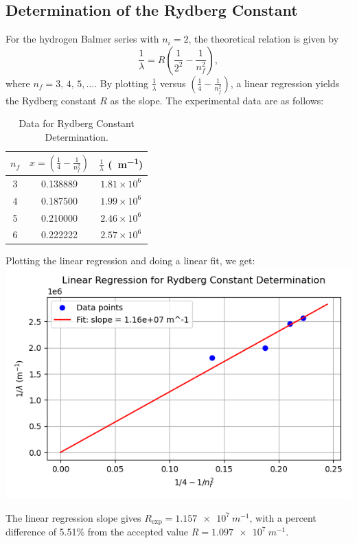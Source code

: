\documentclass[12pt]{article}
\begin{document}
\subsection{Determination of the Rydberg Constant}
For the hydrogen Balmer series with \(n_i = 2\), the theoretical relation is given by
\[
\frac{1}{\lambda} = R \left(\frac{1}{2^2} - \frac{1}{n_f^2}\right),
\]
where \(n_f = 3,\,4,\,5,\dots\). By plotting \(\frac{1}{\lambda}\) versus \(\left(\frac{1}{4}-\frac{1}{n_f^2}\right)\), a linear regression yields the Rydberg constant \(R\) as the slope. The experimental data are as follows:

\begin{table}[H]
  \centering
  \caption{Data for Rydberg Constant Determination.}
  \begin{tabular}{ccc}
    \toprule
    \(n_f\) & \(x = \left(\frac{1}{4} - \frac{1}{n_f^2}\right)\) & \(\frac{1}{\lambda}\) (\SI{}{m^{-1}}) \\
    \midrule
    3 & 0.138889 & \(1.81 \times 10^6\) \\
    4 & 0.187500 & \(1.99 \times 10^6\) \\
    5 & 0.210000 & \(2.46 \times 10^6\) \\
    6 & 0.222222 & \(2.57 \times 10^6\) \\
    \bottomrule
  \end{tabular}
  \label{tab:rydberg_data}
\end{table}

Plotting the linear regression and doing a linear fit, we get: \\
\includegraphics{Figure_1}



The linear regression slope gives \(R_{\text{exp}} = \SI{1.157e7}{m^{-1}}\), with a percent difference of 5.51\% from the accepted value \(R = \SI{1.097e7}{m^{-1}}\).
\end{document}

